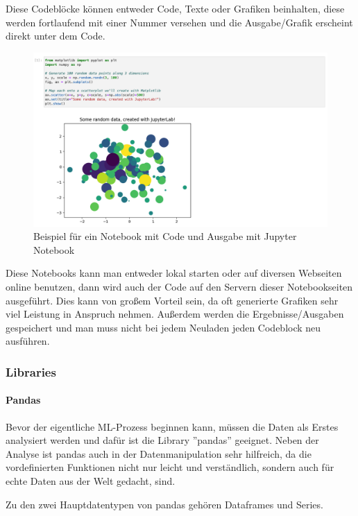 Diese Codeblöcke können entweder Code, Texte oder Grafiken beinhalten, diese werden fortlaufend mit einer Nummer versehen und die Ausgabe/Grafik erscheint direkt unter dem Code.

\begin{figure}[H]
    \centering
    \includegraphics[scale=0.4]{sections/machine-learning/images/jupyter-notebook.png}
    \caption{Beispiel für ein Notebook mit Code und Ausgabe mit Jupyter Notebook}
\end{figure}

Diese Notebooks kann man entweder lokal starten oder auf diversen Webseiten online benutzen, dann wird auch der Code auf den Servern dieser Notebookseiten ausgeführt. Dies kann von großem Vorteil sein, da oft generierte Grafiken sehr viel Leistung in Anspruch nehmen. Außerdem werden die Ergebnisse/Ausgaben gespeichert und man muss nicht bei jedem Neuladen jeden Codeblock neu ausführen.

\subsubsection{Libraries}

\paragraph{Pandas}

Bevor der eigentliche ML-Prozess beginnen kann, müssen die Daten als Erstes analysiert werden und dafür ist die Library ''pandas'' geeignet. Neben der Analyse ist pandas auch in der Datenmanipulation sehr hilfreich, da die vordefinierten Funktionen nicht nur leicht und verständlich, sondern auch für echte Daten aus der Welt gedacht, sind.

Zu den zwei Hauptdatentypen von pandas gehören Dataframes und Series.

